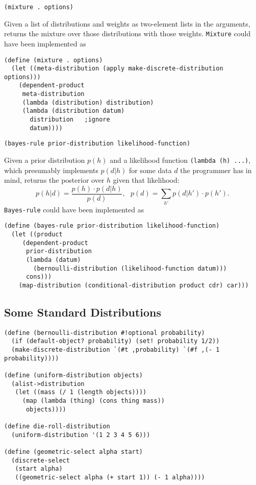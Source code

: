 \documentclass[12pt]{article}
\newcommand{\code}[1]{\texttt{#1}}
\begin{document}
\begin{verbatim}
(mixture . options)
\end{verbatim}

Given a list of distributions and weights as two-element lists in the
arguments, returns the mixture over those distributions with those
weights.  \code{Mixture} could have been implemented as

\begin{verbatim}
(define (mixture . options)
  (let ((meta-distribution (apply make-discrete-distribution options)))
    (dependent-product
     meta-distribution
     (lambda (distribution) distribution)
     (lambda (distribution datum)
       distribution   ;ignore
       datum))))
\end{verbatim}

\begin{verbatim}
(bayes-rule prior-distribution likelihood-function)
\end{verbatim}

Given a prior distribution $p(h)$ and a likelihood function
\code{(lambda (h) ...)}, which presumably implements $p(d|h)$ for
some data $d$ the programmer has in mind, returns the posterior over
$h$ given that likelihood:
\[ p(h|d) = \frac{p(h) \cdot p(d|h)}{p(d)},\ \ \ 
p(d) = \sum_{h'} p(d|h') \cdot p(h'). \]
\code{Bayes-rule} could have been implemented as

\begin{verbatim}
(define (bayes-rule prior-distribution likelihood-function)
  (let ((product
	 (dependent-product
	  prior-distribution
	  (lambda (datum)
	    (bernoulli-distribution (likelihood-function datum)))
	  cons)))
    (map-distribution (conditional-distribution product cdr) car)))
\end{verbatim}

\subsection{Some Standard Distributions}

\begin{verbatim}
(define (bernoulli-distribution #!optional probability)
  (if (default-object? probability) (set! probability 1/2))
  (make-discrete-distribution `(#t ,probability) `(#f ,(- 1 probability))))

(define (uniform-distribution objects)
  (alist->distribution
   (let ((mass (/ 1 (length objects))))
     (map (lambda (thing) (cons thing mass))
	  objects))))

(define die-roll-distribution
  (uniform-distribution '(1 2 3 4 5 6)))

(define (geometric-select alpha start)
  (discrete-select
   (start alpha)
   ((geometric-select alpha (+ start 1)) (- 1 alpha))))
\end{verbatim}
\end{document}

